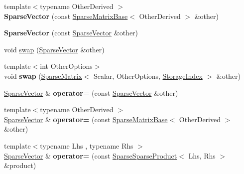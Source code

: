 \begin{DoxyCompactItemize}
\item 
\mbox{\label{class_eigen_1_1_sparse_vector_a8d1871842d020303c9b320612d19fa16}} 
{\footnotesize template$<$typename Other\+Derived $>$ }\\{\bfseries Sparse\+Vector} (const \mbox{\hyperlink{class_eigen_1_1_sparse_matrix_base}{Sparse\+Matrix\+Base}}$<$ Other\+Derived $>$ \&other)
\item 
\mbox{\label{class_eigen_1_1_sparse_vector_af8aea082407cb48fabe6cfa87da675bc}} 
{\bfseries Sparse\+Vector} (const \mbox{\hyperlink{class_eigen_1_1_sparse_vector}{Sparse\+Vector}} \&other)
\item 
void \mbox{\hyperlink{class_eigen_1_1_sparse_vector_a977f1796d4b332a0827c5a1d7b1ed561}{swap}} (\mbox{\hyperlink{class_eigen_1_1_sparse_vector}{Sparse\+Vector}} \&other)
\item 
\mbox{\label{class_eigen_1_1_sparse_vector_a456cb3a5803552f757860a584be246a2}} 
{\footnotesize template$<$int Other\+Options$>$ }\\void {\bfseries swap} (\mbox{\hyperlink{class_eigen_1_1_sparse_matrix}{Sparse\+Matrix}}$<$ Scalar, Other\+Options, \mbox{\hyperlink{class_eigen_1_1_sparse_matrix_base_a0b540ba724726ebe953f8c0df06081ed}{Storage\+Index}} $>$ \&other)
\item 
\mbox{\label{class_eigen_1_1_sparse_vector_a935bfc1abd2a6d621addee147fe53fc9}} 
\mbox{\hyperlink{class_eigen_1_1_sparse_vector}{Sparse\+Vector}} \& {\bfseries operator=} (const \mbox{\hyperlink{class_eigen_1_1_sparse_vector}{Sparse\+Vector}} \&other)
\item 
\mbox{\label{class_eigen_1_1_sparse_vector_a239370c6b972cbba899c89b7ea63d99a}} 
{\footnotesize template$<$typename Other\+Derived $>$ }\\\mbox{\hyperlink{class_eigen_1_1_sparse_vector}{Sparse\+Vector}} \& {\bfseries operator=} (const \mbox{\hyperlink{class_eigen_1_1_sparse_matrix_base}{Sparse\+Matrix\+Base}}$<$ Other\+Derived $>$ \&other)
\item 
\mbox{\label{class_eigen_1_1_sparse_vector_a49616aae95fc196326a02878ff882da9}} 
{\footnotesize template$<$typename Lhs , typename Rhs $>$ }\\\mbox{\hyperlink{class_eigen_1_1_sparse_vector}{Sparse\+Vector}} \& {\bfseries operator=} (const \mbox{\hyperlink{class_eigen_1_1_sparse_sparse_product}{Sparse\+Sparse\+Product}}$<$ Lhs, Rhs $>$ \&product)

\end{DoxyCompactItemize}
